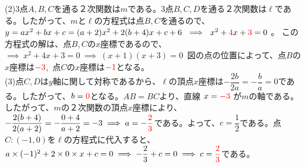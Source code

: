 \documentclass[dvipdfmx,twoside]{jsarticle}
\begin{document}
\begin{CJK}{UTF8}{ipxm}
\noindent
(2)\quad 3点$A,B,C$を通る２次関数は$m$である。3点$B,C,D$を通る２次関数は$\ell$である。したがって、$m$と$\ell$の方程式は点$B,C$を通るので、$y=ax^2+bx+c=(a+2)x^2+2(b+4)x+c+6\ \implies\ x^2+{\color{red}4}x+{\color{red}3}=0$ 。
この方程式の解は、点$B,C$の$x$座標であるので、$\implies \ x^2+4x+3=0\ \implies\ (x+1)(x+3)=0$\ 図の点の位置によって、点$B$の$x$座標は$\color{red}-3$,\ 点$C$の$x$座標は$\color{red}-1$となる。\\

\noindent
(3)\quad 点$C,D$は$y$軸に関して対称であるから、$\ell$の頂点$x$座標は$-\dfrac{2b}{2a}=-\dfrac{b}{a}=0$である。したがって、$b=\color{red}{0}$となる。$AB=BC$より、直線 $x=\color{red}{-3}$ が$m$の軸である。したがって、$m$の２次関数の頂点$x$座標により、$-\dfrac{2(b+4)}{2(a+2)}=-\dfrac{0+4}{a+2}=-3 \implies a=-\color{red}{\dfrac{2}{3}}$である。よって、$c=\dfrac{1}{2}$である。点$C:(-1,0)$を$\ell$の方程式に代入すると、 $a\times (-1)^2+2\times 0\times x+c=0 \implies -\dfrac{2}{3}+c=0 \implies c=\color{red}{\dfrac{2}{3}}$である。

\end{CJK}
\end{document}
